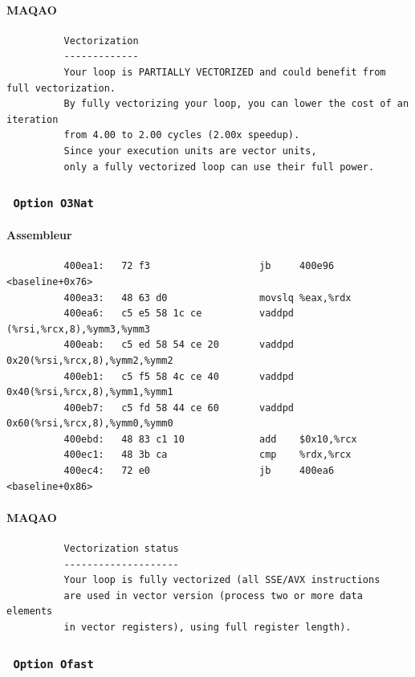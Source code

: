 \documentclass{report}
\begin{document}
      \paragraph{MAQAO}
        \begin{verbatim}
          Vectorization
          -------------
          Your loop is PARTIALLY VECTORIZED and could benefit from full vectorization.
          By fully vectorizing your loop, you can lower the cost of an iteration
          from 4.00 to 2.00 cycles (2.00x speedup).
          Since your execution units are vector units,
          only a fully vectorized loop can use their full power.
        \end{verbatim}
      \subsubsection{ \texttt{ Option O3Nat} }
      \paragraph{Assembleur}
        \begin{verbatim}
          400ea1:	72 f3                	jb     400e96 <baseline+0x76>
          400ea3:	48 63 d0             	movslq %eax,%rdx
          400ea6:	c5 e5 58 1c ce       	vaddpd (%rsi,%rcx,8),%ymm3,%ymm3
          400eab:	c5 ed 58 54 ce 20    	vaddpd 0x20(%rsi,%rcx,8),%ymm2,%ymm2
          400eb1:	c5 f5 58 4c ce 40    	vaddpd 0x40(%rsi,%rcx,8),%ymm1,%ymm1
          400eb7:	c5 fd 58 44 ce 60    	vaddpd 0x60(%rsi,%rcx,8),%ymm0,%ymm0
          400ebd:	48 83 c1 10          	add    $0x10,%rcx
          400ec1:	48 3b ca             	cmp    %rdx,%rcx
          400ec4:	72 e0                	jb     400ea6 <baseline+0x86>
        \end{verbatim}
      \paragraph{MAQAO}
        \begin{verbatim}
          Vectorization status
          --------------------
          Your loop is fully vectorized (all SSE/AVX instructions
          are used in vector version (process two or more data elements
          in vector registers), using full register length).
        \end{verbatim}
      \subsubsection{ \texttt{ Option Ofast } }
\end{document}
